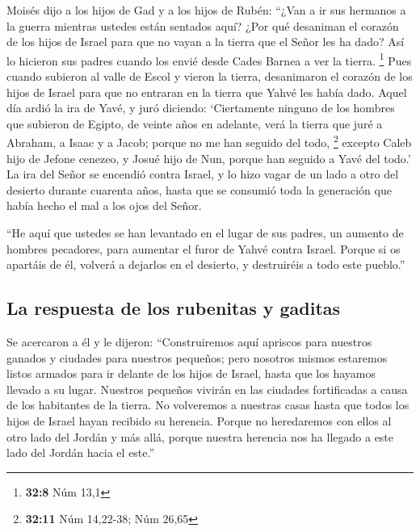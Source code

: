  Moisés dijo a los hijos de Gad y a los hijos de Rubén:
``¿Van a ir sus hermanos a la guerra mientras ustedes están sentados
aquí?  ¿Por qué desaniman el corazón de los hijos de
Israel para que no vayan a la tierra que el Señor les ha dado?
 Así lo hicieron sus padres cuando los envié desde Cades
Barnea a ver la tierra. \footnote{\textbf{32:8} Núm 13,1} 
Pues cuando subieron al valle de Escol y vieron la tierra, desanimaron
el corazón de los hijos de Israel para que no entraran en la tierra que
Yahvé les había dado.  Aquel día ardió la ira de Yavé, y
juró diciendo:  `Ciertamente ninguno de los hombres que
subieron de Egipto, de veinte años en adelante, verá la tierra que juré
a Abraham, a Isaac y a Jacob; porque no me han seguido del todo,
\footnote{\textbf{32:11} Núm 14,22-38; Núm 26,65} 
excepto Caleb hijo de Jefone cenezeo, y Josué hijo de Nun, porque han
seguido a Yavé del todo.'  La ira del Señor se encendió
contra Israel, y lo hizo vagar de un lado a otro del desierto durante
cuarenta años, hasta que se consumió toda la generación que había hecho
el mal a los ojos del Señor.

 ``He aquí que ustedes se han levantado en el lugar de
sus padres, un aumento de hombres pecadores, para aumentar el furor de
Yahvé contra Israel.  Porque si os apartáis de él,
volverá a dejarlos en el desierto, y destruiréis a todo este pueblo.''

\hypertarget{la-respuesta-de-los-rubenitas-y-gaditas}{%
\subsection{La respuesta de los rubenitas y
gaditas}\label{la-respuesta-de-los-rubenitas-y-gaditas}}

 Se acercaron a él y le dijeron: ``Construiremos aquí
apriscos para nuestros ganados y ciudades para nuestros pequeños;
 pero nosotros mismos estaremos listos armados para ir
delante de los hijos de Israel, hasta que los hayamos llevado a su
lugar. Nuestros pequeños vivirán en las ciudades fortificadas a causa de
los habitantes de la tierra.  No volveremos a nuestras
casas hasta que todos los hijos de Israel hayan recibido su herencia.
 Porque no heredaremos con ellos al otro lado del Jordán
y más allá, porque nuestra herencia nos ha llegado a este lado del
Jordán hacia el este.''

